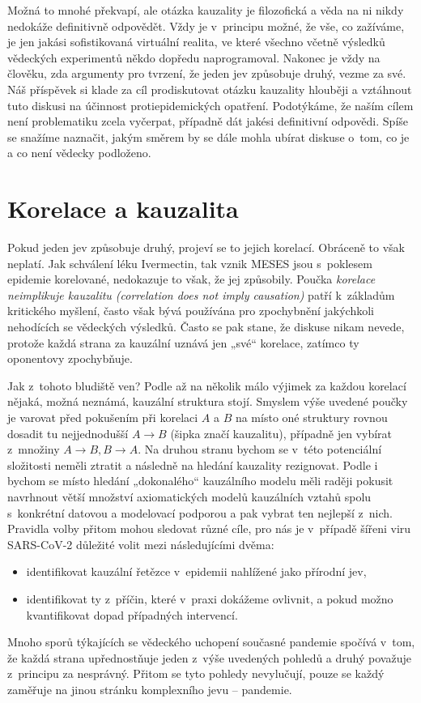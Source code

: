 Možná to mnohé překvapí, ale otázka kauzality je filozofická a věda na ni nikdy nedokáže definitivně odpovědět. Vždy je
v~principu možné, že vše, co zažíváme, je jen jakási sofistikovaná
virtuální realita, ve které všechno včetně výsledků vědeckých experimentů
někdo dopředu naprogramoval. Nakonec je vždy na člověku, zda argumenty
pro tvrzení, že jeden jev způsobuje druhý, vezme za své. Náš příspěvek
si klade za cíl prodiskutovat otázku kauzality hlouběji a vztáhnout
tuto diskusi na účinnost
protiepidemických opatření. Podotýkáme, že naším cílem není problematiku
zcela vyčerpat, případně dát jakési definitivní odpovědi. Spíše se snažíme
naznačit, jakým směrem by se dále mohla ubírat diskuse o~tom, co je
a co není vědecky podloženo.

\section*{Korelace a kauzalita}

Pokud jeden jev způsobuje druhý, projeví se to jejich korelací. Obráceně to však neplatí. Jak schválení léku Ivermectin, tak vznik MESES jsou s~poklesem epidemie korelované, nedokazuje to však, že jej způsobily. Poučka {\em korelace neimplikuje kauzalitu (correlation does not imply causation)} patří k~základům kritického myšlení, často však bývá používána pro zpochybnění jakýchkoli nehodících se vědeckých výsledků. Často se pak stane, že diskuse nikam nevede, protože každá strana za kauzální uznává jen „své“ korelace, zatímco ty oponentovy zpochybňuje.

Jak z~tohoto bludiště ven? Podle \cite{shipley_2000} až na několik málo výjimek za každou korelací nějaká, možná neznámá, kauzální struktura stojí. Smyslem výše uvedené poučky je varovat před pokušením při korelaci $A$ a $B$ na místo oné struktury rovnou dosadit tu nejjednodušší $A\rightarrow B$ (šipka značí kauzalitu), případně jen vybírat z~množiny $A\rightarrow B, B\rightarrow A$. Na druhou stranu bychom se v~této potenciální složitosti neměli ztratit a následně na hledání kauzality rezignovat. Podle \cite{shipley_2000} i \cite{pearl2009causality} bychom se místo hledání „dokonalého“ kauzálního modelu měli raději pokusit navrhnout větší množství axiomatických modelů kauzálních vztahů spolu s~konkrétní datovou a modelovací podporou a pak vybrat ten nejlepší z~nich. Pravidla volby přitom mohou sledovat různé cíle, pro nás je v~případě šířeni viru SARS-CoV-2 důležité volit mezi následujícími dvěma:
\begin{itemize}
\item identifikovat kauzální řetězce v~epidemii nahlížené jako přírodní jev,
\item identifikovat ty z~příčin, které v~praxi dokážeme ovlivnit, a pokud možno kvantifikovat dopad případných intervencí.
\end{itemize}
Mnoho sporů týkajících se vědeckého uchopení současné pandemie spočívá v~tom, že každá strana upřednostňuje jeden z~výše uvedených pohledů a druhý považuje z~principu za nesprávný. Přitom se tyto pohledy nevylučují, pouze se každý zaměřuje na jinou stránku komplexního jevu -- pandemie. 

